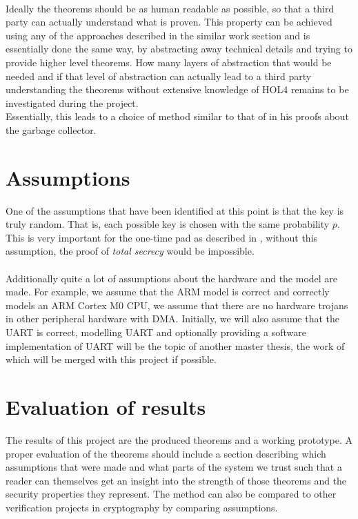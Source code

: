 \documentclass[fleqn]{kththesis}
\begin{document}
\paragraph{}
Ideally the theorems should be as human readable as possible, so that a third party can actually understand what is proven. This property can be achieved using any of the approaches described in the similar work section and is essentially done the same way, by abstracting away technical details and trying to provide higher level theorems. How many layers of abstraction that would be needed and if that level of abstraction can actually lead to a third party understanding the theorems without extensive knowledge of HOL4 remains to be investigated during the project.
\\
Essentially, this leads to a choice of method similar to that of \textcite{myreen_garbage} in his proofs about the garbage collector.

\section{Assumptions}
One of the assumptions that have been identified at this point is that the key is truly random. That is, each possible key is chosen with the same probability $p$. This is very important for the one-time pad as described in \textcite{shannon_otp}, without this assumption, the proof of \emph{total secrecy} would be impossible.
\paragraph{}
Additionally quite a lot of assumptions about the hardware and the model are made. For example, we assume that the ARM model is correct and correctly models an ARM Cortex M0 CPU, we assume that there are no hardware trojans in other peripheral hardware with DMA. Initially, we will also assume that the UART is correct, modelling UART and optionally providing a software implementation of UART will be the topic of another master thesis, the work of which will be merged with this project if possible.


\section{Evaluation of results}
The results of this project are the produced theorems and a working prototype. A proper evaluation of the theorems should include a section describing which assumptions that were made and what parts of the system we trust such that a reader can themselves get an insight into the strength of those theorems and the security properties they represent. The method can also be compared to other verification projects in cryptography by comparing assumptions.
\end{document}
